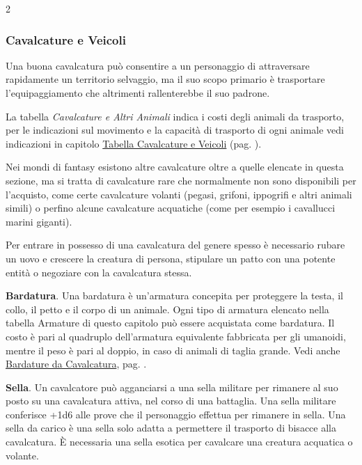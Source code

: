 \begin{multicols}{2}

\subsubsection{Cavalcature e Veicoli}

Una buona cavalcatura può consentire a un personaggio di attraversare rapidamente un territorio selvaggio, ma il suo scopo primario è trasportare l'equipaggiamento che altrimenti rallenterebbe il suo padrone.

La tabella \emph{Cavalcature e Altri Animali} indica i costi degli animali da trasporto, per le indicazioni sul movimento e la capacità di trasporto di ogni animale vedi indicazioni in capitolo \hyperlink{tabella-cavalcature-e-veicoli}{Tabella Cavalcature e Veicoli} (pag. \pageref{tabella-cavalcature-e-veicoli}).

Nei mondi di fantasy esistono altre cavalcature oltre a quelle elencate in questa sezione, ma si tratta di cavalcature rare che normalmente non sono disponibili per l'acquisto, come certe cavalcature volanti (pegasi, grifoni, ippogrifi e altri animali simili) o perfino alcune cavalcature acquatiche (come per esempio i cavallucci marini giganti).

Per entrare in possesso di una cavalcatura del genere spesso è necessario rubare un uovo e crescere la creatura di persona, stipulare un patto con una potente entità o negoziare con la cavalcatura stessa.

\textbf{Bardatura}. Una bardatura è un'armatura concepita per proteggere la testa, il collo, il petto e il corpo di un animale. Ogni tipo di armatura elencato nella tabella Armature di questo capitolo può essere acquistata come bardatura. Il costo è pari al quadruplo dell'armatura equivalente fabbricata per gli umanoidi, mentre il peso è pari al doppio, in caso di animali di taglia grande. Vedi anche \hyperlink{ArmaturedaCavallo}{Bardature da Cavalcatura}, pag. \pageref{ArmaturedaCavallo}.

\textbf{Sella}\hypertarget{Sella}{}. Un cavalcatore può agganciarsi a una sella militare per rimanere al suo posto su una cavalcatura attiva, nel corso di una battaglia. Una sella militare conferisce +1d6 alle prove che il personaggio effettua per rimanere in sella. Una sella da carico è una sella solo adatta a permettere il trasporto di bisacce alla cavalcatura. È necessaria una sella esotica per cavalcare una creatura acquatica o volante.


\end{multicols}
